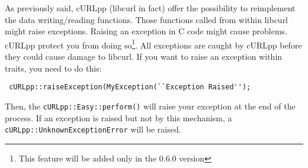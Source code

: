 \documentclass{article}
\begin{document}
As previously said, cURLpp (libcurl in fact) offer the possibility to reimplement the data 
writing/reading functions. Those functions called from within libcurl might 
raise exceptions. Raising an exception in C code might cause problems. cURLpp
protect you from doing so\footnote{This feature will be added only in the 
0.6.0 version}. All exceptions are caught by cURLpp before they could
cause damage to libcurl. If you want to raise an exception within traits, you need
to do this:

\begin{verbatim}
 cURLpp::raiseException(MyException(``Exception Raised'');
\end{verbatim}

Then, the \verb+cURLpp::Easy::perform()+ will raise your exception at the end of 
the process. If an exception is raised but not by this mechanism, a 
\verb+cURLpp::UnknownExceptionError+ will be raised.
\end{document}

